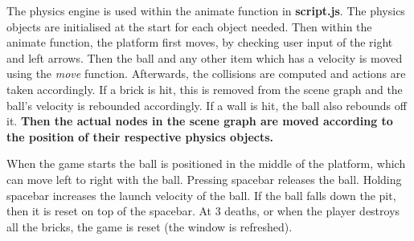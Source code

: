 The physics engine is used within the animate function in \textbf{script.js}. The physics objects are initialised at the start for each object needed. Then within the animate function, the platform first moves, by checking user input of the right and left arrows. Then the ball and any other item which has a velocity is moved using the \textit{move} function. Afterwards, the collisions are computed and actions are taken accordingly. If a brick is hit, this is removed from the scene graph and the ball's velocity is rebounded accordingly. If a wall is hit, the ball also rebounds off it. \textbf{Then the actual nodes in the scene graph are moved according to the position of their respective physics objects.}

When the game starts the ball is positioned in the middle of the platform, which can move left to right with the ball. Pressing spacebar releases the ball. Holding spacebar increases the launch velocity of the ball. If the ball falls down the pit, then it is reset on top of the spacebar. At 3 deaths, or when the player destroys all the bricks, the game is reset (the window is refreshed).